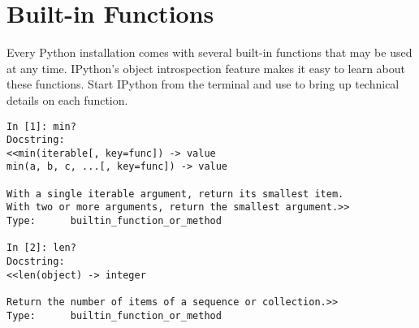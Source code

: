 \label{lab:Standard Library}


\section*{Built-in Functions} %

Every Python installation comes with several built-in functions that may be used at any time.
IPython's object introspection feature makes it easy to learn about these functions.
Start IPython from the terminal and use  to bring up technical details on each function.

\begin{lstlisting}
In [1]: min?
Docstring:
<<min(iterable[, key=func]) -> value
min(a, b, c, ...[, key=func]) -> value

With a single iterable argument, return its smallest item.
With two or more arguments, return the smallest argument.>>
Type:      builtin_function_or_method

In [2]: len?
Docstring:
<<len(object) -> integer

Return the number of items of a sequence or collection.>>
Type:      builtin_function_or_method
\end{lstlisting}

